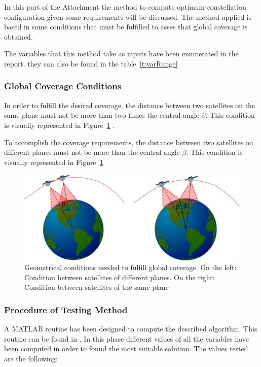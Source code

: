 In this part of the Attachment the method to compute optimum constellation configuration given some requirements will be discussed. The method applied is based in some conditions that must be fulfilled to asses that global coverage is obtained.

The variables that this method take as inputs have been enumerated in the report. they can also be found in the table~\ref{t:varRange}

\subsubsection{Global Coverage Conditions}

In order to fulfill the desired coverage, the distance between two satellites on the same plane must not be more than two times the central angle $\beta$. This condition is visually represented in Figure~\ref{fig:ConditionGCoverage} .

To accomplish the coverage requirements, the distance between two satellites on different planes must not be more than the central angle $\beta$. This condition is visually represented in Figure~\ref{fig:ConditionGCoverage} 

\begin{figure}[H] %
	\centering
	\includegraphics[width=.8\textwidth]{./testing/ConditionGCoverage.png}
	\caption[Geometrical conditions needed to fulfill global coverage]{Geometrical conditions needed to fulfill global coverage. On the left: Condition between satellites of different planes. On the right: Condition between satellites of the same plane}
	\label{fig:ConditionGCoverage}
\end{figure}

\subsubsection{Procedure of Testing Method}
A MATLAB routine has been designed to compute the described algorithm. This routine can be found in \cite[Chapter 1, Section 4]{annex6}. In this phase different values of all the variables have been computed in order to found the most suitable solution. The values tested are the following:

